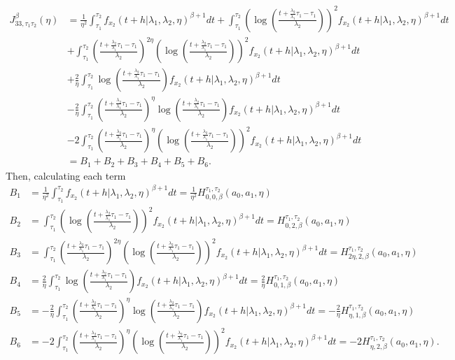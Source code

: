 \documentclass{article}
\begin{document}
\begin{align*}
J_{33,\tau_1\tau_2}^{\beta}(\eta)&=\frac{1}{\eta^2}\int_{\tau_1}^{\tau_2}f_{x_2}(t+h|\lambda_1,\lambda_2,\eta)^{\beta+1}dt+\int_{\tau_1}^{\tau_2}\left(\log\left(\frac{t+\frac{\lambda_2}{\lambda_1}\tau_1-\tau_1}{\lambda_2}\right)\right)^2f_{x_2}(t+h|\lambda_1,\lambda_2,\eta)^{\beta+1}dt
\\
&+\int_{\tau_1}^{\tau_2}\left(\frac{t+\frac{\lambda_2}{\lambda_1}\tau_1-\tau_1}{\lambda_2}\right)^{2\eta}\left(\log\left(\frac{t+\frac{\lambda_2}{\lambda_1}\tau_1-\tau_1}{\lambda_2}\right)\right)^2f_{x_2}(t+h|\lambda_1,\lambda_2,\eta)^{\beta+1}dt
\\
&+\frac{2}{\eta}\int_{\tau_1}^{\tau_2}\log\left(\frac{t+\frac{\lambda_2}{\lambda_1}\tau_1-\tau_1}{\lambda_2}\right)f_{x_2}(t+h|\lambda_1,\lambda_2,\eta)^{\beta+1}dt
\\
&-\frac{2}{\eta}\int_{\tau_1}^{\tau_2}\left(\frac{t+\frac{\lambda_2}{\lambda_1}\tau_1-\tau_1}{\lambda_2}\right)^{\eta}\log\left(\frac{t+\frac{\lambda_2}{\lambda_1}\tau_1-\tau_1}{\lambda_2}\right)f_{x_2}(t+h|\lambda_1,\lambda_2,\eta)^{\beta+1}dt
\\
&-2\int_{\tau_1}^{\tau_2}\left(\frac{t+\frac{\lambda_2}{\lambda_1}\tau_1-\tau_1}{\lambda_2}\right)^{\eta}\left(\log\left(\frac{t+\frac{\lambda_2}{\lambda_1}\tau_1-\tau_1}{\lambda_2}\right)\right)^2f_{x_2}(t+h|\lambda_1,\lambda_2,\eta)^{\beta+1}dt
\\
&=B_1+B_2+B_3+B_4+B_5+B_6.
\end{align*}
Then, calculating each term
\begin{align*}
B_1&=\frac{1}{\eta^2}\int_{\tau_1}^{\tau_2}f_{x_2}(t+h|\lambda_1,\lambda_2,\eta)^{\beta+1}dt=\frac{1}{\eta^2}H_{0,0,\beta}^{\tau_1,\tau_2}(a_0,a_1,\eta)
\\
B_2&=\int_{\tau_1}^{\tau_2}\left(\log\left(\frac{t+\frac{\lambda_2}{\lambda_1}\tau_1-\tau_1}{\lambda_2}\right)\right)^2f_{x_2}(t+h|\lambda_1,\lambda_2,\eta)^{\beta+1}dt=H_{0,2,\beta}^{\tau_1,\tau_2}(a_0,a_1,\eta)
\\
B_3&=\int_{\tau_1}^{\tau_2}\left(\frac{t+\frac{\lambda_2}{\lambda_1}\tau_1-\tau_1}{\lambda_2}\right)^{2\eta}\left(\log\left(\frac{t+\frac{\lambda_2}{\lambda_1}\tau_1-\tau_1}{\lambda_2}\right)\right)^2f_{x_2}(t+h|\lambda_1,\lambda_2,\eta)^{\beta+1}dt=H_{2\eta,2,\beta}^{\tau_1,\tau_2}(a_0,a_1,\eta)
\\
B_4&=\frac{2}{\eta}\int_{\tau_1}^{\tau_2}\log\left(\frac{t+\frac{\lambda_2}{\lambda_1}\tau_1-\tau_1}{\lambda_2}\right)f_{x_2}(t+h|\lambda_1,\lambda_2,\eta)^{\beta+1}dt=\frac{2}{\eta}H_{0,1,\beta}^{\tau_1,\tau_2}(a_0,a_1,\eta)
\\
B_5&=-\frac{2}{\eta}\int_{\tau_1}^{\tau_2}\left(\frac{t+\frac{\lambda_2}{\lambda_1}\tau_1-\tau_1}{\lambda_2}\right)^{\eta}\log\left(\frac{t+\frac{\lambda_2}{\lambda_1}\tau_1-\tau_1}{\lambda_2}\right)f_{x_2}(t+h|\lambda_1,\lambda_2,\eta)^{\beta+1}dt=-\frac{2}{\eta}H_{\eta,1,\beta}^{\tau_1,\tau_2}(a_0,a_1,\eta)
\\
B_6&=-2\int_{\tau_1}^{\tau_2}\left(\frac{t+\frac{\lambda_2}{\lambda_1}\tau_1-\tau_1}{\lambda_2}\right)^{\eta}\left(\log\left(\frac{t+\frac{\lambda_2}{\lambda_1}\tau_1-\tau_1}{\lambda_2}\right)\right)^2f_{x_2}(t+h|\lambda_1,\lambda_2,\eta)^{\beta+1}dt=-2H_{\eta,2,\beta}^{\tau_1,\tau_2}(a_0,a_1,\eta).
\end{align*}
\end{document}
